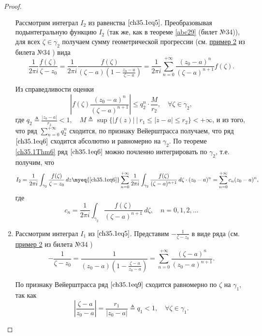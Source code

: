 \begin{leftbar}
\begin{proof}
\begin{enumerate}
Рассмотрим интеграл $I_2$ из равенства $\eqref{ch35.1eq5}$. Преобразовывая подынтегральную функцию $I_2$ (так же, как в теореме \ref{abc29} (билет №34)), для всех $\zeta \in \gamma_2$ получаем сумму геометрической прогрессии (см. \hyperref[exmpl2]{пример 2} из билета №34 ) вида
\begin{equation} \label{ch35.1eq6}
\frac{1}{2\pi i} \frac{f(\zeta)}{\zeta - z_0} = \frac{1}{2\pi i} \frac{f(\zeta)}{(\zeta - a) \left( 1 - \frac{z_0 - a}{\zeta - a}\right)} = \frac{1}{2\pi i}\sum\limits_{n = 0}^{+\infty} \frac{(z_0 - a)^n}{(\zeta - a)^{n + 1}} f(\zeta).
\end{equation}

Из справедливости оценки
$$
\left| f(\zeta) \frac{(z_0 - a)^n}{(\zeta - a)^{n + 1}}\right| \le q_{2}^n \cdot \frac{M}{r_2}, \quad \forall \zeta \in \gamma_2,
$$
где $q_2 \triangleq \frac{|z_0 - a|}{r_2} < 1, \quad M \triangleq \sup \{ |f(z)| \: \big| \: r_1 \le |z - a| \le r_2\} < +\infty$, и из того, что ряд $\sum\limits_{n = 0}^{+\infty} q_{2}^n$ сходится, по признаку Вейерштрасса получаем, что ряд $\eqref{ch35.1eq6}$ сходится абсолютно и равномерно на $\gamma_2$. По теореме \ref{ch35.1Thm6}  ряд $\eqref{ch35.1eq6}$ можно почленно интегрировать по $\gamma_2$, т.е. получим, что 
\begin{equation} \label{ch35.1eq7}
I_2 = \frac{1}{2\pi i} \int_{\gamma_2} \frac{f(\zeta)}{\zeta - z_0} \,d z \myeq{\eqref{ch35.1eq6}} \sum\limits_{n = 0}^{+\infty} \frac{1}{2\pi i} \int_{\gamma_2} \frac{f(\zeta)}{(\zeta - a)^{n + 1}} \,d\zeta \cdot (z_0 - a)^n = \sum\limits_{n = 0}^{+\infty} c_n (z_0 - a)^n,
\end{equation}
где 
\begin{equation} \label{ch35.1eq8}
c_n = \frac{1}{2\pi i} \int_{\gamma_2}  \frac{f(\zeta)}{(\zeta - a)^{n + 1}} \,d\zeta, \quad n = 0,1,2,\ldots
\end{equation}

\item

Рассмотрим интеграл $I_1$ из $\eqref{ch35.1eq5}$. Представим $-\frac{1}{\zeta - z_0}$ в виде ряда (см. \hyperref[exmpl2]{пример 2} из билета №34 )
\begin{equation} \label{ch35.1eq9}
-\frac{1}{\zeta - z_0} = \frac{1}{(z_0 - a) \left( 1 - \frac{\zeta - a}{z_0 - a}\right)} = \sum_{n = 0}^{+\infty} \frac{(\zeta - a)^n}{(z_0 - a)^{n + 1}}.
\end{equation}

По признаку Вейерштрасса ряд $\eqref{ch35.1eq9}$ сходится равномерно по $\zeta$ на $\gamma_1$, так как
$$
\left| \frac{\zeta - a}{z_0 - a}\right| = \frac{r_1}{|z_0 - a|} \triangleq q_1 < 1, \quad \forall \zeta \in \gamma_1.
$$


\end{enumerate}
\end{proof}
\end{leftbar}
